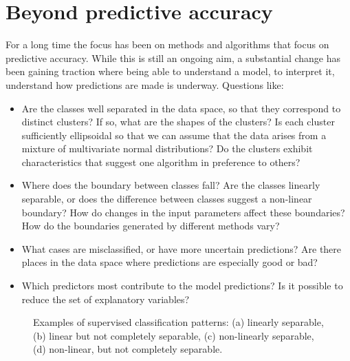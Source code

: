 \documentclass[
  letterpaper,
]{krantz}
\providecommand{\tightlist}{%
  \setlength{\itemsep}{0pt}\setlength{\parskip}{0pt}}\usepackage{longtable,booktabs,array}
\begin{document}

\section{Beyond predictive accuracy}\label{beyond-predictive-accuracy}

For a long time the focus has been on methods and algorithms that focus
on predictive accuracy. While this is still an ongoing aim, a
substantial change has been gaining traction where being able to
understand a model, to interpret it, understand how predictions are made
is underway. Questions like:

\begin{itemize}
\tightlist
\item
  Are the classes well separated in the data space, so that they
  correspond to distinct clusters? If so, what are the shapes of the
  clusters? Is each cluster sufficiently ellipsoidal so that we can
  assume that the data arises from a mixture of multivariate normal
  distributions? Do the clusters exhibit characteristics that suggest
  one algorithm in preference to others?
\item
  Where does the boundary between classes fall? Are the classes linearly
  separable, or does the difference between classes suggest a non-linear
  boundary? How do changes in the input parameters affect these
  boundaries? How do the boundaries generated by different methods vary?
\item
  What cases are misclassified, or have more uncertain predictions? Are
  there places in the data space where predictions are especially good
  or bad?
\item
  Which predictors most contribute to the model predictions? Is it
  possible to reduce the set of explanatory variables?
\end{itemize}

\begin{figure}


\caption{\label{fig-sup-example}Examples of supervised classification
patterns: (a) linearly separable, (b) linear but not completely
separable, (c) non-linearly separable, (d) non-linear, but not
completely separable.}

\end{figure}%
\end{document}
